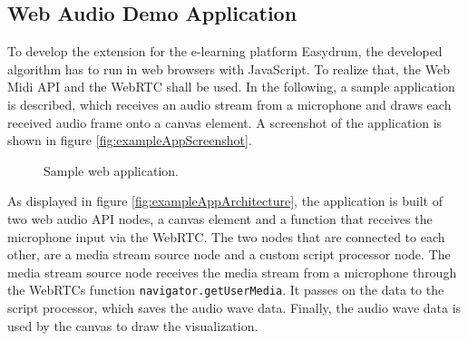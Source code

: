 \subsection{Web Audio Demo Application} \label{section:methodJavascript}

To develop the extension for the e-learning platform Easydrum, the developed algorithm has to run in web browsers with JavaScript. To realize that, the Web Midi API and the WebRTC shall be used. In the following, a sample application is described, which receives an audio stream from a microphone and draws each received audio frame onto a canvas element. A screenshot of the application is shown in figure \ref{fig:exampleAppScreenshot}.

\begin{figure}[ht]
	\centering
	\qquad
	\caption{
		Sample web application.
	}
	\label{fig:exampleApp}
\end{figure}

As displayed in figure \ref{fig:exampleAppArchitecture}, the application is built of two web audio API nodes, a canvas element and a function that receives the microphone input via the WebRTC. The two nodes that are connected to each other, are a media stream source node and a custom script processor node. The media stream source node receives the media stream from a microphone through the WebRTCs function \lstinline{navigator.getUserMedia}. It passes on the data to the script processor, which saves the audio wave data. Finally, the audio wave data is used by the canvas to draw the visualization. 


